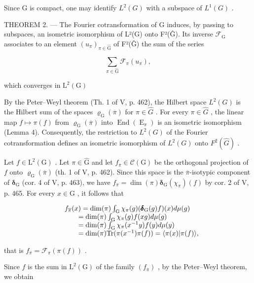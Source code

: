 Since G is compact, one may identify \(L^{2}(G)\) with a subspace of \(L^{1}(G)\) .

THEOREM 2. --- The Fourier cotransformation of G induces, by passing to subspaces, an isometric isomorphism of L²(G) onto F²(Ĝ). Its inverse \(\mathcal{F}_{\mathrm{G}}\) associates to an element \((u_{\pi})_{\pi \in \widehat{\mathrm{G}}}\) of F²(Ĝ) the sum of the series

\[
\sum_ {\pi \in \widehat {\mathrm{G}}} \mathcal {F} _ {\pi} (u _ {\pi}),
\]

which converges in \(\mathrm{L}^2 (\mathrm{G})\)

By the Peter–Weyl theorem (Th. 1 of V, p. 462), the Hilbert space \(L^{2}(G)\) is the Hilbert sum of the spaces \(\varrho_{\mathrm{G}}(\overline{\pi})\) for \(\pi \in \widehat{G}\) . For every \(\pi \in \widehat{G}\) , the linear map \(f \mapsto \pi(f)\) from \(\varrho_{\mathrm{G}}(\overline{\pi})\) into \(\operatorname{End}(\operatorname{E}_{\pi})\) is an isometric isomorphism (Lemma 4). Consequently, the restriction to \(L^{2}(G)\) of the Fourier cotransformation defines an isometric isomorphism of \(L^{2}(G)\) onto \(F^{2}(\widehat{G})\) .

Let \(f \in \mathrm{L}^2(\mathrm{G})\) . Let \(\pi \in \widehat{\mathrm{G}}\) and let \(f_{\overline{\pi}} \in \mathcal{C}(\mathrm{G})\) be the orthogonal projection of \(f\) onto \(\varrho_{\mathrm{G}}(\overline{\pi})\) (th. 1 of V, p. 462). Since this space is the \(\overline{\pi}\)-isotypic component of \(\pmb{\delta}_{\mathrm{G}}\) (cor. 4 of V, p. 463), we have \(f_{\overline{\pi}} = \dim(\pi)\pmb{\delta}_{\mathrm{G}}(\chi_{\pi})(f)\) by cor. 2 of V, p. 465. For every \(x \in \mathrm{G}\) , it follows that

\[
\begin{array}{r l} & {f _ {\overline {{\pi}}} (x) = \dim (\pi) \int_ {\mathrm{G}} \chi_ {\pi} (g) (\pmb {\delta} _ {\mathrm{G}} (g) f) (x) d \mu (g)} \\ & {\qquad = \dim (\pi) \int_ {\mathrm{G}} \chi_ {\pi} (g) f (x g) d \mu (g)} \\ & {\qquad = \dim (\pi) \int_ {\mathrm{G}} \chi_ {\pi} (x ^ {- 1} y) f (y) d \mu (y)} \\ & {\qquad = \dim (\pi) \mathrm{Tr} (\pi (x ^ {- 1}) \pi (f)) = \langle \pi (x) | \pi (f) \rangle ,} \end{array}
\]

that is \(f_{\overline{\pi}} = \mathcal{F}_{\pi}(\pi(f))\) .

Since \(f\) is the sum in \(\mathrm{L}^2 (\mathrm{G})\) of the family \((f_{\overline{\pi}})\) , by the Peter–Weyl theorem, we obtain

